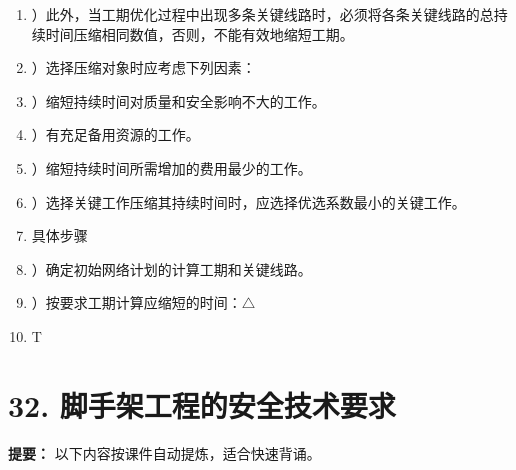 \documentclass[UTF8,fontset=fandol,11pt]{ctexart}
\begin{document}
\begin{enumerate}[label=\arabic*.]
\item ）此外，当工期优化过程中出现多条关键线路时，必须将各条关键线路的总持续时间压缩相同数值，否则，不能有效地缩短工期。

\item ）选择压缩对象时应考虑下列因素：

\item ）缩短持续时间对质量和安全影响不大的工作。

\item ）有充足备用资源的工作。

\item ）缩短持续时间所需增加的费用最少的工作。

\item ）选择关键工作压缩其持续时间时，应选择优选系数最小的关键工作。

\item 具体步骤

\item ）确定初始网络计划的计算工期和关键线路。

\item ）按要求工期计算应缩短的时间：$\triangle$

\item T

\end{enumerate}

\newpage

\section*{32. 脚手架工程的安全技术要求}


\begin{mainbox}

\textbf{提要：} 以下内容按课件自动提炼，适合快速背诵。

\end{mainbox}
\end{document}
